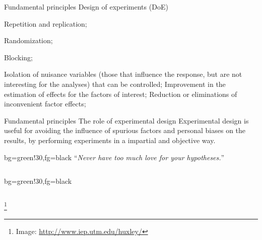 \documentclass[t]{beamer}
\begin{document}

\begin{ftst}
{Fundamental principles}
{Design of experiments (DoE)}
\begin{block}{}
	\bitems Repetition and replication;
		\item Randomization;
		\item \alert{Blocking};
	\eitem
\end{block}
\bitems Isolation of nuisance variables (those that influence the response, but are not interesting for the analyses) that can be controlled;
	\spitem Improvement in the estimation of effects for the factors of interest;
	\spitem Reduction or eliminations of inconvenient factor effects;
\eitem
\end{ftst}


\begin{ftst}
{Fundamental principles}
{The role of experimental design}
Experimental design is useful for avoiding the influence of spurious factors and personal biases on the results, by performing experiments in a impartial and objective way.
\begin{colorblock}{}{bg=green!30,fg=black}
	\vhalf
	\centering``\textit{Never have too much love for your hypotheses.}''
	\vspace{0.5em}
\end{colorblock}
\vone
\begin{columns}[T] 
	\begin{colorblock}{}{bg=green!30,fg=black}
		\vspace{0.5em}
	\end{colorblock}
\end{columns}
\let\thefootnote\relax\footnote{\tiny Image: \url{http://www.iep.utm.edu/huxley/}}
\end{ftst}
\end{document}
